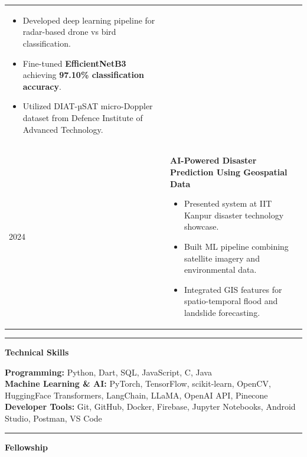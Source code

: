 \documentclass[11pt]{article}
\newcommand{\cvsection}[1]{%
\vspace{12pt}%
\noindent%
{\color{headingblue}\rule{40pt}{5pt}}%
\hspace{10pt}%
{\Large\textbf{\color{headingblue}#1}}%
\vspace{6pt}%
\color{black}%
}
\begin{document}
\begin{tabularx}{\textwidth}{@{}p{95pt}X@{}}
\begin{itemize}[leftmargin=*,nosep]
\item Developed deep learning pipeline for radar-based drone vs bird classification.
\item Fine-tuned \textbf{EfficientNetB3} achieving \textbf{97.10\% classification accuracy}.
\item Utilized DIAT-µSAT micro-Doppler dataset from Defence Institute of Advanced Technology.
\end{itemize}
\\[6pt]

2024 &
\textbf{AI-Powered Disaster Prediction Using Geospatial Data}

\begin{itemize}[leftmargin=*,nosep]
\item Presented system at IIT Kanpur disaster technology showcase.
\item Built ML pipeline combining satellite imagery and environmental data.
\item Integrated GIS features for spatio-temporal flood and landslide forecasting.
\end{itemize}
\\[6pt]



\end{tabularx}
\endgroup



\cvsection{Technical Skills}

\textbf{Programming:} Python, Dart, SQL, JavaScript, C, Java \\
\textbf{Machine Learning \& AI:} PyTorch, TensorFlow, scikit-learn, OpenCV, HuggingFace Transformers, LangChain, LLaMA, OpenAI API, Pinecone \\
\textbf{Developer Tools:} Git, GitHub, Docker, Firebase, Jupyter Notebooks, Android Studio, Postman, VS Code



\newpage
\cvsection{Fellowship}
\end{document}
